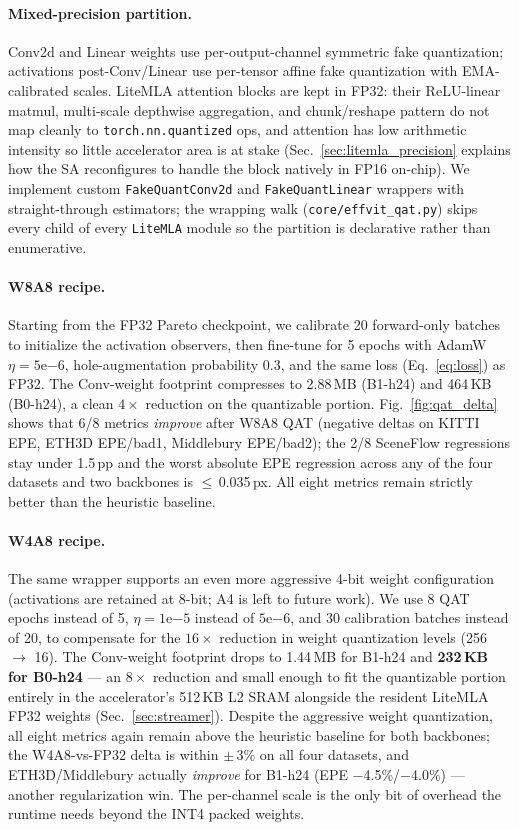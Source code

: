 \documentclass[journal]{IEEEtran}
\begin{document}
\paragraph{Mixed-precision partition.} Conv2d and Linear weights use per-output-channel symmetric fake quantization; activations post-Conv/Linear use per-tensor affine fake quantization with EMA-calibrated scales. LiteMLA attention blocks are kept in FP32: their ReLU-linear matmul, multi-scale depthwise aggregation, and chunk/reshape pattern do not map cleanly to \texttt{torch.nn.quantized} ops, and attention has low arithmetic intensity so little accelerator area is at stake (Sec.~\ref{sec:litemla_precision} explains how the SA reconfigures to handle the block natively in FP16 on-chip). We implement custom \texttt{FakeQuantConv2d} and \texttt{FakeQuantLinear} wrappers with straight-through estimators; the wrapping walk (\texttt{core/effvit\_qat.py}) skips every child of every \texttt{LiteMLA} module so the partition is declarative rather than enumerative.

\paragraph{W8A8 recipe.} Starting from the FP32 Pareto checkpoint, we calibrate 20 forward-only batches to initialize the activation observers, then fine-tune for 5 epochs with AdamW $\eta\!=\!5\mathrm{e}{-6}$, hole-augmentation probability 0.3, and the same loss (Eq.~\ref{eq:loss}) as FP32. The Conv-weight footprint compresses to 2.88\,MB (B1-h24) and 464\,KB (B0-h24), a clean $4\times$ reduction on the quantizable portion. Fig.~\ref{fig:qat_delta} shows that 6/8 metrics \emph{improve} after W8A8 QAT (negative deltas on KITTI EPE, ETH3D EPE/bad1, Middlebury EPE/bad2); the 2/8 SceneFlow regressions stay under 1.5\,pp and the worst absolute EPE regression across any of the four datasets and two backbones is $\leq$\,0.035\,px. All eight metrics remain strictly better than the heuristic baseline.

\paragraph{W4A8 recipe.} The same wrapper supports an even more aggressive 4-bit weight configuration (activations are retained at 8-bit; A4 is left to future work). We use 8 QAT epochs instead of 5, $\eta\!=\!1\mathrm{e}{-5}$ instead of $5\mathrm{e}{-6}$, and 30 calibration batches instead of 20, to compensate for the $16\times$ reduction in weight quantization levels (256 $\to$ 16). The Conv-weight footprint drops to 1.44\,MB for B1-h24 and \textbf{232\,KB for B0-h24} --- an $8\times$ reduction and small enough to fit the quantizable portion entirely in the accelerator's 512\,KB L2 SRAM alongside the resident LiteMLA FP32 weights (Sec.~\ref{sec:streamer}). Despite the aggressive weight quantization, all eight metrics again remain above the heuristic baseline for both backbones; the W4A8-vs-FP32 delta is within $\pm\,$3\% on all four datasets, and ETH3D/Middlebury actually \emph{improve} for B1-h24 (EPE $-$4.5\%/$-$4.0\%) --- another regularization win. The per-channel scale is the only bit of overhead the runtime needs beyond the INT4 packed weights.
\end{document}
